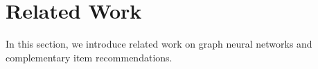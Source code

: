 \documentclass[letterpaper]{article} %
\begin{document}


\section{Related Work}
In this section, we introduce related work on graph neural networks and complementary item recommendations.
\end{document}
